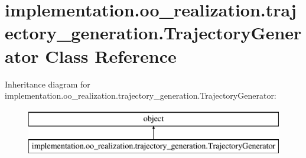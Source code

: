 \hypertarget{classimplementation_1_1oo__realization_1_1trajectory__generation_1_1_trajectory_generator}{}\section{implementation.\+oo\+\_\+realization.\+trajectory\+\_\+generation.\+Trajectory\+Generator Class Reference}
\label{classimplementation_1_1oo__realization_1_1trajectory__generation_1_1_trajectory_generator}
Inheritance diagram for implementation.\+oo\+\_\+realization.\+trajectory\+\_\+generation.\+Trajectory\+Generator\+:\begin{figure}[H]
\begin{center}
\leavevmode
\includegraphics[height=2.000000cm]{classimplementation_1_1oo__realization_1_1trajectory__generation_1_1_trajectory_generator}
\end{center}
\end{figure}
